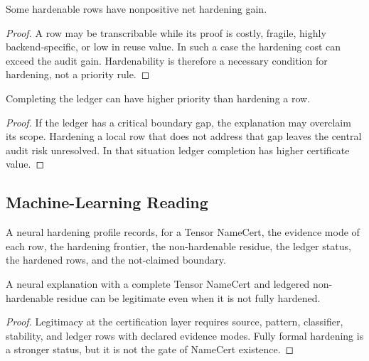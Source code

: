 \begin{theorem}
\label{thm:philosophy-not-every-hardenable-row-immediate}
Some hardenable rows have nonpositive net hardening gain.
\end{theorem}
\begin{proof}
A row may be transcribable while its proof is costly, fragile, highly
backend-specific, or low in reuse value. In such a case the hardening
cost can exceed the audit gain. Hardenability is therefore a necessary
condition for hardening, not a priority rule.
\end{proof}

\begin{theorem}
\label{thm:philosophy-ledger-completion-can-outrank-hardening}
Completing the ledger can have higher priority than hardening a row.
\end{theorem}
\begin{proof}
If the ledger has a critical boundary gap, the explanation may
overclaim its scope. Hardening a local row that does not address that
gap leaves the central audit risk unresolved. In that situation ledger
completion has higher certificate value.
\end{proof}

\subsection{Machine-Learning Reading}
\label{subsec:philosophy-ledger-only-machine-learning}

\begin{definition}
\label{def:philosophy-neural-hardening-profile}
A neural hardening profile records, for a Tensor NameCert, the evidence
mode of each row, the hardening frontier, the non-hardenable residue, the
ledger status, the hardened rows, and the not-claimed boundary.
\end{definition}

\begin{theorem}
\label{thm:philosophy-neural-explanations-legitimate-without-full-formalization}
A neural explanation with a complete Tensor NameCert and ledgered
non-hardenable residue can be legitimate even when it is not fully
hardened.
\end{theorem}
\begin{proof}
Legitimacy at the certification layer requires source, pattern,
classifier, stability, and ledger rows with declared evidence modes.
Fully formal hardening is a stronger status, but it is not the gate of
NameCert existence.
\end{proof}

